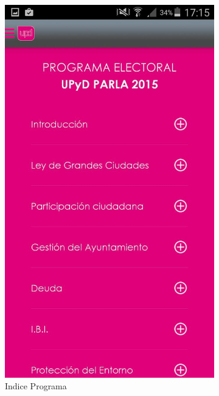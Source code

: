 \begin{figure}[H]
        \centering
        \begin{subfigure}[b]{0.3\textwidth}
                \includegraphics[width=\textwidth]{Media/Captures/UPyDParlaIndex.jpg}
                \caption{Indice Programa}
                \label{fig:upydIndex}
        \end{subfigure}
        ~
        \begin{subfigure}[b]{0.3\textwidth}

\end{subfigure}
\end{figure}
